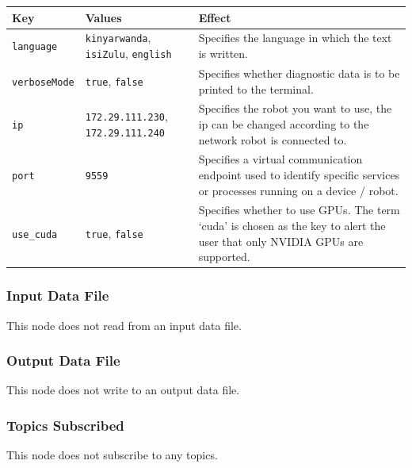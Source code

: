 \documentclass{CSSRforAfrica}
\begin{document}
{\begin{center}
\begin{tabularx}{\linewidth}{| l | l | X|}
\hline 
{\small Key }                               & {\small Values }                                                 &  {\small Effect}       \\
\hline
{\footnotesize \verb+language+}  & {\footnotesize \verb+kinyarwanda+, \verb+isiZulu+, \verb+english+}  &  {\small Specifies the language in which the text is written.} \\ 
\hline
{\footnotesize \verb+verboseMode+}  & {\footnotesize \verb+true+, \verb+false+}     & {\small Specifies whether diagnostic data is to be printed to the terminal.} \\
\hline

{\footnotesize \verb+ip+}  & {\footnotesize \verb+172.29.111.230+, \verb+172.29.111.240+}     & {\small Specifies the robot you want to use, the ip can be changed according to the network robot is connected to.} \\
\hline

{\footnotesize \verb+port+}  & {\footnotesize \verb+9559+}     & {\small Specifies a virtual communication endpoint used to identify specific services or processes running on a device / robot.} \\
\hline

{\footnotesize \verb+use_cuda+}  & {\footnotesize \verb+true+, \verb+false+}     & {\small Specifies whether to use GPUs. The term `cuda' is chosen as the key to alert the user that only NVIDIA GPUs are supported.} \\
\hline

\end{tabularx}
\end{center}


\subsubsection*{Input Data File}
This node does not read from an input data file.


\subsubsection*{Output Data File}
This node does not write to an output data file.


\subsubsection*{Topics Subscribed}
This node does not subscribe to any topics.
 

}
\end{document}
